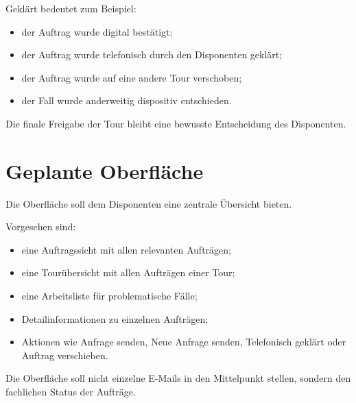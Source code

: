\documentclass[12pt,a4paper]{article}
\begin{document}
	Geklärt bedeutet zum Beispiel:
	
	\begin{itemize}
		\item der Auftrag wurde digital bestätigt;
		\item der Auftrag wurde telefonisch durch den Disponenten geklärt;
		\item der Auftrag wurde auf eine andere Tour verschoben;
		\item der Fall wurde anderweitig dispositiv entschieden.
	\end{itemize}
	
	Die finale Freigabe der Tour bleibt eine bewusste Entscheidung des Disponenten.
	
	\section{Geplante Oberfläche}
	
	Die Oberfläche soll dem Disponenten eine zentrale Übersicht bieten.
	
	Vorgesehen sind:
	
	\begin{itemize}
		\item eine Auftragssicht mit allen relevanten Aufträgen;
		\item eine Tourübersicht mit allen Aufträgen einer Tour;
		\item eine Arbeitsliste für problematische Fälle;
		\item Detailinformationen zu einzelnen Aufträgen;
		\item Aktionen wie \glqq Anfrage senden\grqq, \glqq Neue Anfrage senden\grqq, \glqq Telefonisch geklärt\grqq{} oder \glqq Auftrag verschieben\grqq.
	\end{itemize}
	
	Die Oberfläche soll nicht einzelne E-Mails in den Mittelpunkt stellen, sondern den fachlichen Status der Aufträge.


	
\end{document}
